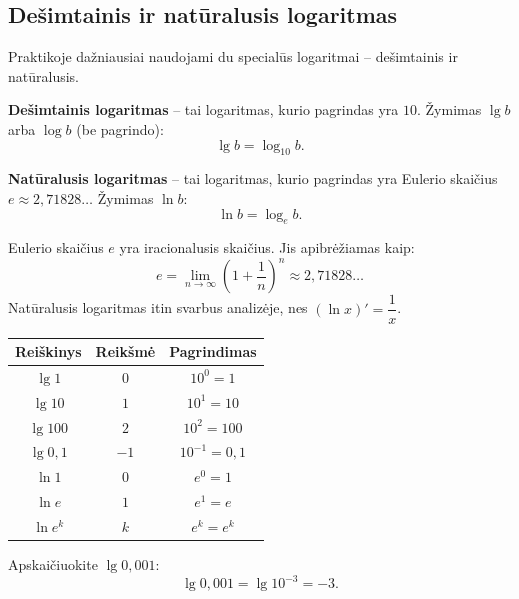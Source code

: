 \subsection{Dešimtainis ir natūralusis logaritmas}

Praktikoje dažniausiai naudojami du specialūs logaritmai – dešimtainis ir natūralusis.

\begin{definition}
\textbf{Dešimtainis logaritmas} – tai logaritmas, kurio pagrindas yra $10$. Žymimas $\lg b$ arba $\log b$ (be pagrindo):
\[
\lg b = \log_{10} b.
\]
\end{definition}

\begin{definition}
\textbf{Natūralusis logaritmas} – tai logaritmas, kurio pagrindas yra Eulerio skaičius $e \approx 2{,}71828\ldots$ Žymimas $\ln b$:
\[
\ln b = \log_e b.
\]
\end{definition}

\begin{remark}
Eulerio skaičius $e$ yra iracionalusis skaičius. Jis apibrėžiamas kaip:
\[
e = \lim_{n \to \infty} \left(1 + \frac{1}{n}\right)^n \approx 2{,}71828\ldots
\]
Natūralusis logaritmas itin svarbus analizėje, nes $(\ln x)' = \dfrac{1}{x}$.
\end{remark}

\begin{tcolorbox}[title=Specialiosios reikšmės]
\begin{center}
\begin{tabular}{|c|c|c|}
\hline
\textbf{Reiškinys} & \textbf{Reikšmė} & \textbf{Pagrindimas} \\
\hline
$\lg 1$ & $0$ & $10^0 = 1$ \\
$\lg 10$ & $1$ & $10^1 = 10$ \\
$\lg 100$ & $2$ & $10^2 = 100$ \\
$\lg 0{,}1$ & $-1$ & $10^{-1} = 0{,}1$ \\
$\ln 1$ & $0$ & $e^0 = 1$ \\
$\ln e$ & $1$ & $e^1 = e$ \\
$\ln e^k$ & $k$ & $e^k = e^k$ \\
\hline
\end{tabular}
\end{center}
\end{tcolorbox}

\begin{example}
Apskaičiuokite $\lg 0{,}001$:
\[
\lg 0{,}001 = \lg 10^{-3} = -3.
\]
\end{example}

